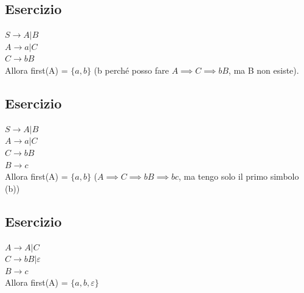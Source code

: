 \subsection{Esercizio}
$S \rightarrow A|B$\\
$A \rightarrow a|C$\\
$C \rightarrow bB$\\
Allora first(A) = $\{ a, b \}$ (b perch\'e posso fare $A \implies C \implies bB$, ma B non esiste). 

\subsection{Esercizio}
$S \rightarrow A|B$\\
$A \rightarrow a|C$\\
$C \rightarrow bB$\\
$B \rightarrow c$\\
Allora first(A) = $\{ a, b \}$ ($A \implies C \implies bB \implies bc$, ma tengo solo il primo simbolo (b)) 

\subsection{Esercizio}
$A \rightarrow A|C$\\
$C \rightarrow bB|\varepsilon$\\
$B \rightarrow c$\\
Allora first(A) = $\{ a, b, \varepsilon\}$

